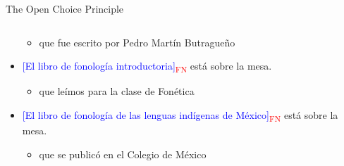 \documentclass{beamer}
\begin{document}
\begin{frame}{The Open Choice Principle}
\begin{columns}
\begin{column}{6cm}
\begin{itemize}
\begin{itemize}
            \item que fue escrito por Pedro Martín Butragueño
        \end{itemize}
        \item \textcolor{blue}{{[El libro de fonología introductoria]}}\textcolor{red}{\textsubscript{FN}} está sobre la mesa.
        \begin{itemize}
            \item que leímos para la clase de Fonética
        \end{itemize}
        \item \textcolor{blue}{{[El libro de fonología de las lenguas indígenas de México]}}\textcolor{red}{\textsubscript{FN}} está sobre la mesa.
        \begin{itemize}
            \item que se publicó en el Colegio de México
        \end{itemize}
        \end{itemize}
        \end{column}
    \end{columns}
\end{frame}
\end{document}

